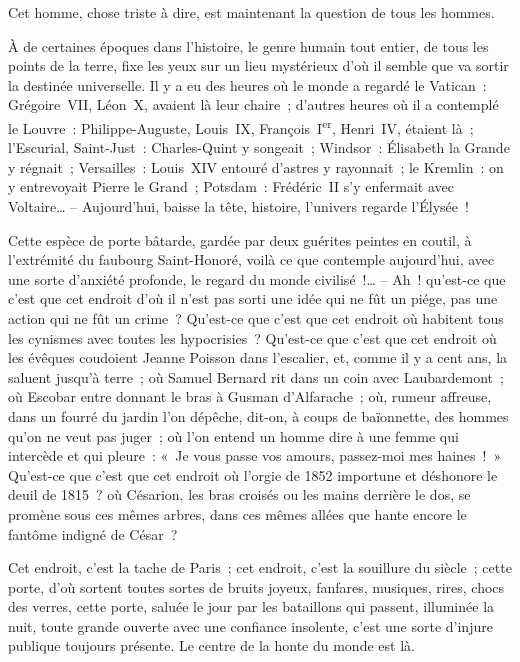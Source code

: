 \documentclass[french,twoside]{book} %
\begin{document}
Cet homme, chose triste à dire, est maintenant la question de tous les hommes.\par
À de certaines époques dans l’histoire, le genre humain tout entier, de tous les points de la terre, fixe les yeux sur un lieu mystérieux d’où il semble que va sortir la destinée universelle. Il y a eu des heures où le monde a regardé le Vatican : Grégoire VII, Léon X, avaient là leur chaire ; d’autres heures où il a contemplé le Louvre : Philippe-Auguste, Louis IX, François I\textsuperscript{er}, Henri IV, étaient là ; l’Escurial, Saint-Just : Charles-Quint y songeait ; Windsor : Élisabeth la Grande y régnait ; Versailles : Louis XIV entouré d’astres y rayonnait ; le Kremlin : on y entrevoyait Pierre le Grand ; Potsdam : Frédéric II s’y enfermait avec Voltaire… – Aujourd’hui, baisse la tête, histoire, l’univers regarde l’Élysée !\par
Cette espèce de porte bâtarde, gardée par deux guérites peintes en coutil, à l’extrémité du faubourg Saint-Honoré, voilà ce que contemple aujourd’hui, avec une sorte d’anxiété profonde, le regard du monde civilisé !… – Ah ! qu’est-ce que c’est que cet endroit d’où il n’est pas sorti une idée qui ne fût un piége, pas une action qui ne fût un crime ? Qu’est-ce que c’est que cet endroit où habitent tous les cynismes avec toutes les hypocrisies ? Qu’est-ce que c’est que cet endroit où les évêques coudoient Jeanne Poisson dans l’escalier, et, comme il y a cent ans, la saluent jusqu’à terre ; où Samuel Bernard rit dans un coin avec Laubardemont ; où Escobar entre donnant le bras à Gusman d’Alfarache ; où, rumeur affreuse, dans un fourré du jardin l’on dépêche, dit-on, à coups de baïonnette, des hommes qu’on ne veut pas juger ; où l’on entend un homme dire à une femme qui intercède et qui pleure : « Je vous passe vos amours, passez-moi mes haines ! » Qu’est-ce que c’est que cet endroit où l’orgie de 1852 importune et déshonore le deuil de 1815 ? où Césarion, les bras croisés ou les mains derrière le dos, se promène sous ces mêmes arbres, dans ces mêmes allées que hante encore le fantôme indigné de César ?\par
Cet endroit, c’est la tache de Paris ; cet endroit, c’est la souillure du siècle ; cette porte, d’où sortent toutes sortes de bruits joyeux, fanfares, musiques, rires, chocs des verres, cette porte, saluée le jour par les bataillons qui passent, illuminée la nuit, toute grande ouverte avec une confiance insolente, c’est une sorte d’injure publique toujours présente. Le centre de la honte du monde est là.\par
\end{document}
